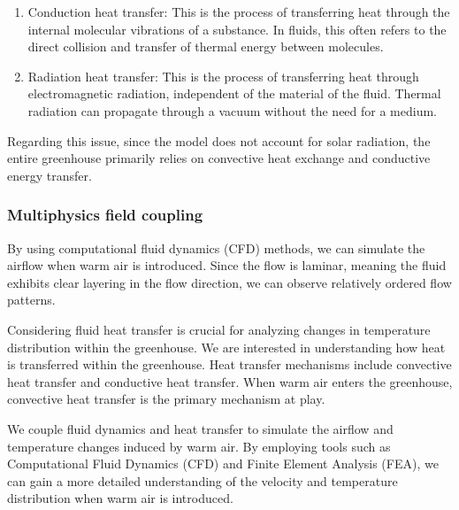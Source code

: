 \documentclass{apmcmthesis}
\begin{document}
{\begin{enumerate}
  \item Conduction heat transfer: This is the process of transferring heat through the internal molecular vibrations of a substance. In fluids, this often refers to the direct collision and transfer of thermal energy between molecules.

    \item Radiation heat transfer: This is the process of transferring heat through electromagnetic radiation, independent of the material of the fluid. Thermal radiation can propagate through a vacuum without the need for a medium.
\end{enumerate}

Regarding this issue, since the model does not account for solar radiation, the entire greenhouse primarily relies on convective heat exchange and conductive energy transfer.

\subsubsection{Multiphysics field coupling}

By using computational fluid dynamics (CFD) methods, we can simulate the airflow when warm air is introduced. Since the flow is laminar, meaning the fluid exhibits clear layering in the flow direction, we can observe relatively ordered flow patterns.

Considering fluid heat transfer is crucial for analyzing changes in temperature distribution within the greenhouse. We are interested in understanding how heat is transferred within the greenhouse. Heat transfer mechanisms include convective heat transfer and conductive heat transfer. When warm air enters the greenhouse, convective heat transfer is the primary mechanism at play.

We couple fluid dynamics and heat transfer to simulate the airflow and temperature changes induced by warm air. By employing tools such as Computational Fluid Dynamics (CFD) and Finite Element Analysis (FEA), we can gain a more detailed understanding of the velocity and temperature distribution when warm air is introduced.

}
\end{document}
